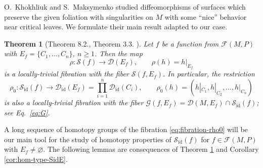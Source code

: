 \documentclass[10pt,reqno]{amsart}
\newtheorem{theorem}[subsection]{Theorem}
\newcommand{\Sid}{\mathcal{S}_{\id}(f)}
\newcommand{\F}{\mathcal{F}(M,P)}
\newcommand{\id}{\mathrm{id}}
\begin{document}
 O.~Khokhliuk and S.~Maksymenko \cite{KhohliykMaksymenko:Indag:2020} studied diffeomorphisms of surfaces which preserve the given foliation with singularities on $M$ with some ``nice'' behavior near critical leaves.  We formulate their main result adapted to our case.
\begin{theorem}[Theorem 8.2., Theorem 3.3.  \cite{KhohliykMaksymenko:Indag:2020}]\label{thm:fibration-rho}
	Let $f$ be a function from $\mathcal{F}(M,P)$ with   $E_f = \{C_1, \ldots, C_n\}$, $n\geq 1$.
	Then the map 
	\begin{equation}\label{eq:fibration-rho}
			\rho:\mathcal{S}(f)\to \mathcal{D}(E_f),\qquad\rho(h) = h|_{E_f}
	\end{equation}
is a locally-trivial fibration with the fiber $ \mathcal{S}(f,E_f)$. In particular, the restriction 
\begin{equation}\label{eq:fibration-rho0}
	\rho_0:\mathcal{S}_{\id}(f)\to \mathcal{D}_{\id}(E_f) =\prod_{i = 1}^n\mathcal{D}_{\id}(C_i), \qquad \rho_0(h) = (h|_{C_1}, h|_{C_2}, \ldots, h|_{C_n})
\end{equation}
is also a locally-trivial fibration with the fiber $\mathcal{G}(f,E_f) = \mathcal{D}(M, E_f)\cap \Sid$; see  {\rm Eq.~\eqref{eq:G}}.
\end{theorem}
A long sequence of homotopy groups of the fibration \eqref{eq:fibration-rho0} will be our main tool for the study of homotopy properties of $\Sid$ for $f\in \F$ with $E_f\neq \varnothing$.
The following lemmas are  consequences of Theorem \ref{thm:fibration-rho} and Corollary \ref{cor:hom-type-SidE}.
\end{document}
